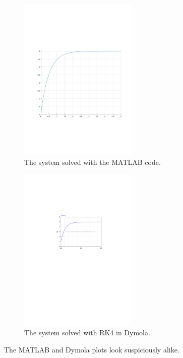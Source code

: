 \documentclass{article}
\begin{document}
\begin{figure}[!ht]
    \centering
    \includegraphics[width = 0.5\textwidth]{ex2_2_RK4_plot}
    \caption{The system solved with the MATLAB code.}
    \label{fig:RK4MATLAB} 
\end{figure}

\begin{figure}[!ht]
    \centering
    \includegraphics[width = 0.5\textwidth]{ex2_2d}
    \caption{The system solved with RK4 in Dymola.}
    \label{fig:RK4Dymola} 
\end{figure}

The MATLAB and Dymola plots look suspiciously alike.
\end{document}
